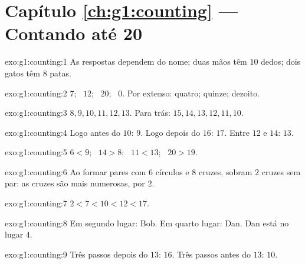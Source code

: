 \section*{Capítulo \ref{ch:g1:counting} --- Contando até 20}

\begin{solution}{exo:g1:counting:1}
As respostas dependem do nome; duas mãos têm $10$ dedos; dois gatos
têm $8$ patas.
\end{solution}

\begin{solution}{exo:g1:counting:2}
$7$; \ $12$; \ $20$; \ $0$. Por extenso: quatro; quinze; dezoito.
\end{solution}

\begin{solution}{exo:g1:counting:3}
$8, 9, 10, 11, 12, 13$. Para trás: $15, 14, 13, 12, 11, 10$.
\end{solution}

\begin{solution}{exo:g1:counting:4}
Logo antes do $10$: $9$. Logo depois do $16$: $17$. Entre $12$ e
$14$: $13$.
\end{solution}

\begin{solution}{exo:g1:counting:5}
$6 < 9$; \ $14 > 8$; \ $11 < 13$; \ $20 > 19$.
\end{solution}

\begin{solution}{exo:g1:counting:6}
Ao formar pares com $6$ círculos e $8$ cruzes, sobram $2$ cruzes sem
par: as cruzes são mais numerosas, por $2$.
\end{solution}

\begin{solution}{exo:g1:counting:7}
$2 < 7 < 10 < 12 < 17$.
\end{solution}

\begin{solution}{exo:g1:counting:8}
Em segundo lugar: Bob. Em quarto lugar: Dan. Dan está no lugar $4$.
\end{solution}

\begin{solution}{exo:g1:counting:9}
Três passos depois do $13$: $16$. Três passos antes do $13$: $10$.
\end{solution}
